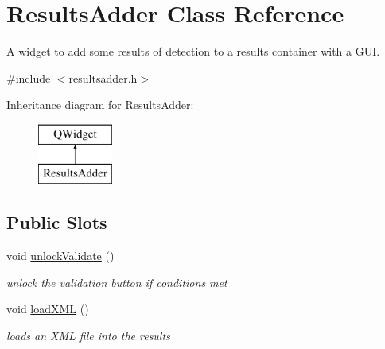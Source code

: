 \hypertarget{class_results_adder}{}\section{Results\+Adder Class Reference}
\label{class_results_adder}


A widget to add some results of detection to a results container with a G\+UI.  




{\ttfamily \#include $<$resultsadder.\+h$>$}

Inheritance diagram for Results\+Adder\+:\begin{figure}[H]
\begin{center}
\leavevmode
\includegraphics[height=2.000000cm]{class_results_adder}
\end{center}
\end{figure}
\subsection*{Public Slots}
\begin{DoxyCompactItemize}
\item 
void \hyperlink{class_results_adder_a97ff952c7d562a74704ca2315cb5dba2}{unlock\+Validate} ()\hypertarget{class_results_adder_a97ff952c7d562a74704ca2315cb5dba2}{}\label{class_results_adder_a97ff952c7d562a74704ca2315cb5dba2}

\begin{DoxyCompactList}\small\item\em unlock the validation button if conditions met \end{DoxyCompactList}\item 
void \hyperlink{class_results_adder_a5040ff5ce4aad855727d3f64d775fcb9}{load\+X\+ML} ()\hypertarget{class_results_adder_a5040ff5ce4aad855727d3f64d775fcb9}{}\label{class_results_adder_a5040ff5ce4aad855727d3f64d775fcb9}

\begin{DoxyCompactList}\small\item\em loads an X\+ML file into the results \end{DoxyCompactList}\end{DoxyCompactItemize}
